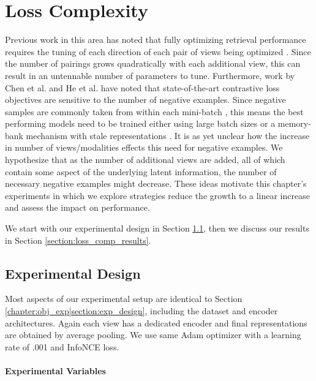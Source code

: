 \chapter{Loss Complexity}
\label{chapter:loss_complexity}

Previous work in this area has noted that fully optimizing retrieval performance requires the tuning of each direction of each pair of views being optimized .
Since the number of pairings grows quadratically with each additional view, this can result in an untennable number of parameters to tune.
Furthermore, work by Chen et al. \cite{chen2020simple} and He et al. \cite{he2020momentum} have noted that state-of-the-art contrastive loss objectives are sensitive to the number of negative examples.
Since negative samples are commonly taken from within each mini-batch \cite{oord2018representation, ilharco2019large}, this means the best performing models need to be trained either using large batch sizes or a memory-bank mechanism with stale representations \cite{he2020momentum} .
It is as yet unclear how the increase in number of views/modalities effects this need for negative examples.
We hypothesize that as the number of additional views are added, all of which contain some aspect of the underlying latent information, the number of necessary negative examples might decrease.
These ideas motivate this chapter's experiments in which we explore strategies reduce the growth to a linear increase and assess the impact on performance.

We start with our experimental design in Section \ref{chapter:loss_comp|section:exp_design}, then we discuss our results in Section \ref{section:loss_comp_results}.

\section{Experimental Design}
\label{chapter:loss_comp|section:exp_design}
Most aspects of our experimental setup are identical to Section \ref{chapter:obj_exp|section:exp_design}, including the dataset and encoder architectures.
Again each view has a dedicated encoder and final representations are obtained by average pooling.
We use same Adam optimizer with a learning rate of .001 and InfoNCE loss.

\subsubsection{Experimental Variables}

